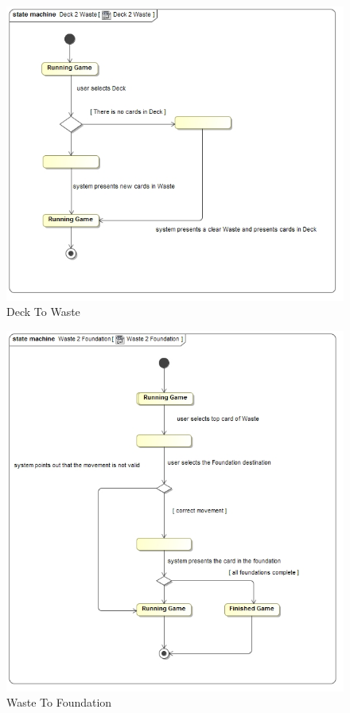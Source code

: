 \documentclass[11pt]{article}
\begin{document}
\begin{center}
 \begin{figure}[H]
 \begin{center}
   \includegraphics[width=15cm]{DomainModel/Deck2Waste.jpg}
   \caption{Deck To Waste}
   \label{fig:deck2waste}
 \end{center}
 \end{figure}
\end{center}
\begin{center}

\begin{figure}[H]
 \begin{center}
   \includegraphics[width=15cm]{DomainModel/Waste2Foundation.jpg}
   \caption{Waste To Foundation}
   \label{fig:waste2foundation}
 \end{center}
 \end{figure}
\end{center}
\end{document}
